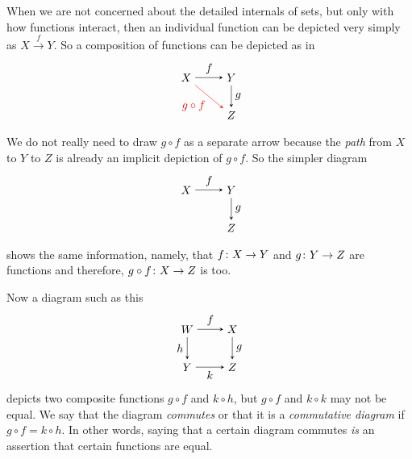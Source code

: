 When we are not concerned about the detailed internals of sets, but only with how functions interact, then an individual function can be depicted very simply as $X\stackrel{f}{\longrightarrow} Y$.
So a composition of functions can be depicted as in
\[
\tikzset{>=stealth}
\begin{tikzpicture}[every node/.style={midway}]
\matrix[column sep={4em,between origins},
        row sep={2em}] at (0,0)
{ \node(A)   {$X$}  ; & \node(B) {$Y$}; \\
                      & \node(C) {$Z$}; \\};
\draw[->] (A) -- (B) node[anchor=south]  {$f$};
\draw[->] (B) -- (C) node[anchor=west]  {$g$};
\draw[->,red] (A) -- (C) node[anchor=north east] {$g\circ f$};
\end{tikzpicture}
\]
We do not really need to draw $g\circ f$ as a separate arrow because the \emph{path} from $X$ to $Y$ to $Z$ is already an implicit depiction of $g\circ f$.
So the simpler diagram 
\[
\tikzset{>=stealth}
\begin{tikzpicture}[every node/.style={midway}]
\matrix[column sep={4em,between origins},
        row sep={2em}] at (0,0)
{ \node(A)   {$X$}  ; & \node(B) {$Y$}; \\
                      & \node(C) {$Z$}; \\};
\draw[->] (A) -- (B) node[anchor=south]  {$f$};
\draw[->] (B) -- (C) node[anchor=west]  {$g$};
\end{tikzpicture}
\]
shows the same information, namely, that ${f}\colon{X}\to{Y}$ and ${g}\colon{Y}\to{Z}$ are functions and therefore, ${g\circ f}\colon{X}\to{Z}$ is too.

Now a diagram such as this
\[
\tikzset{>=stealth}
\begin{tikzpicture}[every node/.style={midway}]
\matrix[column sep={4em,between origins},
        row sep={2em}] at (0,0)
{ \node(A)   {$W$}  ; & \node(B) {$X$}; \\
  \node(D)   {$Y$}  ; & \node(C) {$Z$}; \\};
\draw[->] (A) -- (B) node[anchor=south]  {$f$};
\draw[->] (B) -- (C) node[anchor=west]  {$g$};
\draw[->] (A) -- (D) node[anchor=east] {$h$};
\draw[->] (D) -- (C) node[anchor=north] {$k$};
\end{tikzpicture}
\]
depicts two composite functions $g\circ f$ and $k\circ h$, but $g\circ f$ and $k\circ k$ may not be equal.
We say that the diagram \emph{commutes} or that it is a \emph{commutative diagram} if $g\circ f = k\circ h$.
In other words, saying that a certain diagram commutes \emph{is} an assertion that certain functions are equal.


